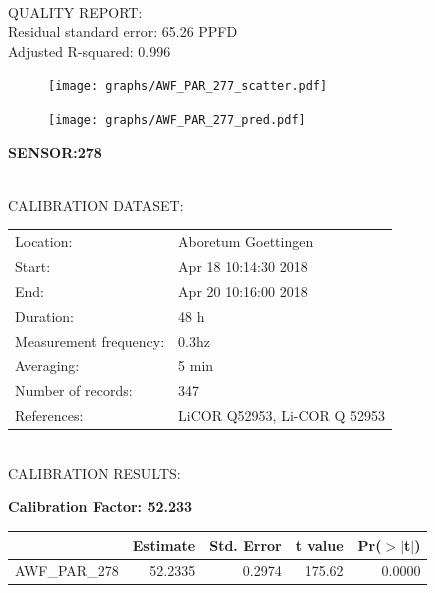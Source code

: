 \documentclass[oneside]{report}
\begin{document}
\hrulefill\\
QUALITY REPORT:\\
Residual standard error: 65.26 PPFD\\
Adjusted R-squared: 0.996



\begin{figure}[H]
  \centering
  \texttt{[image: graphs/AWF\_PAR\_277\_scatter.pdf]}
\end{figure}




\begin{figure}[H]
  \centering
  \texttt{[image: graphs/AWF\_PAR\_277\_pred.pdf]}
\end{figure}

\pagebreak


\begin{center}
\large{\textbf{SENSOR:278}}\\
\end{center}

\hrulefill\\
CALIBRATION DATASET:\\
\begin{table}[h!]
  \centering
  \label{tab:table1}
  \begin{tabular}{ll}
    Location: & Aboretum Goettingen\\ 
    
    
    Start:  & Apr 18 10:14:30 2018 \\
    End:   & Apr 20 10:16:00 2018\\ 
    Duration: & 48 h\\
    Measurement frequency: & 0.3hz\\
    Averaging:  &5 min\\
    Number of records: & 347 \\
    References: & LiCOR Q52953, Li-COR Q 52953 \\
  \end{tabular}
\end{table}

\hrulefill\\
CALIBRATION RESULTS:\\


\begin{center}
\textbf{\large{Calibration Factor: 52.233}}\\
\end{center}
\begin{table}[ht]
\centering
\begin{tabular}{rrrrr}
  \hline
 & Estimate & Std. Error & t value & Pr($>$$|$t$|$) \\ 
  \hline
AWF\_PAR\_278 & 52.2335 & 0.2974 & 175.62 & 0.0000 \\ 
   \hline
\end{tabular}
\end{table}
\end{document}
